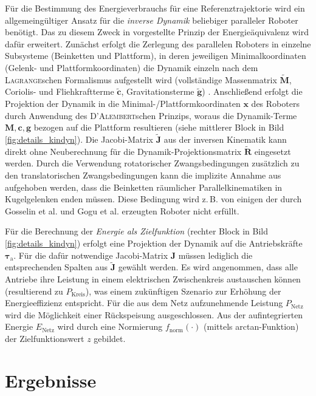 \documentclass[fleqn,a4paper,10pt]{article}
\newcommand{\bm}[1]{\mathbf{#1}}
\begin{document}
\begin{multicols}{2}
Für die Bestimmung des Energieverbrauchs für eine Referenztrajektorie wird ein allgemeingültiger Ansatz für die \emph{inverse Dynamik} beliebiger paralleler Roboter benötigt.
Das zu diesem Zweck in \cite{AbdellatifHei2009,DoThanhKotHeiOrt2009b} vorgestellte Prinzip der Energieäquivalenz wird dafür erweitert.
Zunächst erfolgt die Zerlegung des parallelen Roboters in einzelne Subsysteme (Beinketten und Plattform), in deren jeweiligen Minimalkoordinaten (Gelenk- und Plattformkoordinaten) die Dynamik einzeln nach dem \textsc{Lagrange}schen Formalismus aufgestellt wird (vollständige Massenmatrix $\tilde{\bm{M}}$, Coriolis- und Fliehkraftterme $\tilde{\bm{c}}$, Gravitationsterme $\tilde{\bm{g}}$) \cite{DoThanhKotHeiOrt2009b}.
Anschließend erfolgt die Projektion der Dynamik in die Minimal-/Plattformkoordinaten $\bm{x}$ des Roboters durch Anwendung des \textsc{D'Alembert}schen Prinzips, woraus die Dynamik-Terme $\bm{M},\bm{c},\bm{g}$ bezogen auf die Plattform resultieren \cite{DoThanhKotHeiOrt2009b,AbdellatifHei2009} (siehe mittlerer Block in Bild\,\ref{fig:details_kindyn}).
Die Jacobi-Matrix $\tilde{\bm{J}}$ aus der inversen Kinematik kann direkt ohne Neuberechnung für die Dynamik-Projektionsmatrix $\tilde{\bm{R}}$ eingesetzt werden.
Durch die Verwendung rotatorischer Zwangsbedingungen \cite{SchapplerTapOrt2019c} zusätzlich zu den translatorischen Zwangsbedingungen kann die implizite Annahme aus \cite{AbdellatifHei2009} aufgehoben werden, dass die Beinketten räumlicher Parallelkinematiken in Kugelgelenken enden müssen.
Diese Bedingung wird z.\,B. von einigen der durch Gosselin et al. \cite{KongGos2007} und Gogu et al. \cite{Gogu2008} erzeugten Roboter nicht erfüllt.

Für die Berechnung der \emph{Energie als Zielfunktion} (rechter Block in Bild\,\ref{fig:details_kindyn}) erfolgt eine Projektion der Dynamik auf die Antriebskräfte $\bm{\tau}_\mathrm{a}$. 
Für die dafür notwendige Jacobi-Matrix $\bm{J}$ müssen lediglich die entsprechenden Spalten aus $\tilde{\bm{J}}$ gewählt werden.
Es wird angenommen, dass alle Antriebe ihre Leistung in einem elektrischen Zwischenkreis austauschen können (resultierend zu $P_\mathrm{Kreis}$), was einem zukünftigen Szenario zur Erhöhung der Energieeffizienz entspricht.
Für die aus dem Netz aufzunehmende Leistung $P_\mathrm{Netz}$ wird die Möglichkeit einer  Rückspeisung ausgeschlossen.
Aus der aufintegrierten Energie $E_\mathrm{Netz}$ wird durch eine Normierung $f_\mathrm{norm}(\cdot)$ (mittels arctan-Funktion) der Zielfunktionswert $z$ gebildet.

\section{Ergebnisse}


\end{multicols}
\end{document}
